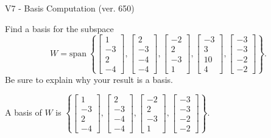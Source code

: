 \begin{exercise}
  \begin{exerciseTitle}V7 - Basis Computation (ver. 650)\end{exerciseTitle}
  \begin{exerciseStatement}
    Find a basis for the subspace 
\[W=\mathrm{span}\ \left\{\left[\begin{array}{r}
1 \\
-3 \\
2 \\
-4
\end{array}\right] , \left[\begin{array}{r}
2 \\
-3 \\
-4 \\
-4
\end{array}\right] , \left[\begin{array}{r}
-2 \\
2 \\
-3 \\
1
\end{array}\right] , \left[\begin{array}{r}
-3 \\
3 \\
10 \\
4
\end{array}\right] , \left[\begin{array}{r}
-3 \\
-3 \\
-2 \\
-2
\end{array}\right]\right\}.\]
 Be sure to explain why your result is a basis.


  \end{exerciseStatement}
  \begin{exerciseAnswer}
   A basis of \(W\) is  \(\left\{\left[\begin{array}{r}
1 \\
-3 \\
2 \\
-4
\end{array}\right] , \left[\begin{array}{r}
2 \\
-3 \\
-4 \\
-4
\end{array}\right] , \left[\begin{array}{r}
-2 \\
2 \\
-3 \\
1
\end{array}\right] , \left[\begin{array}{r}
-3 \\
-3 \\
-2 \\
-2
\end{array}\right]\right\}\).
  


  \end{exerciseAnswer}
\end{exercise}